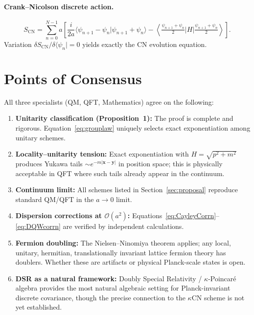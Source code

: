 \documentclass[11pt,a4paper]{article}
\begin{document}
\paragraph{Crank--Nicolson discrete action.}
\begin{equation}
  S_{\mathrm{CN}} = \sum_{n=0}^{N-1} a\left[\frac{i}{2a}\langle\psi_{n+1}-\psi_n|\psi_{n+1}+\psi_n\rangle - \left\langle\tfrac{\psi_{n+1}+\psi_n}{2}\Big|H\Big|\tfrac{\psi_{n+1}+\psi_n}{2}\right\rangle\right].
  \label{eq:CNaction}
\end{equation}
Variation $\delta S_{\mathrm{CN}}/\delta\langle\psi_n|=0$ yields exactly the CN evolution equation.

\section{Points of Consensus}
\label{sec:consensus}

All three specialists (QM, QFT, Mathematics) agree on the following:

\begin{enumerate}
  \item \textbf{Unitarity classification (Proposition~1):} The proof is complete and rigorous. Equation~\eqref{eq:grouplaw} uniquely selects exact exponentiation among unitary schemes.
  \item \textbf{Locality--unitarity tension:} Exact exponentiation with $H = \sqrt{p^2+m^2}$ produces Yukawa tails $\sim e^{-m|\mathbf{x}-\mathbf{y}|}$ in position space; this is physically acceptable in QFT where such tails already appear in the continuum.
  \item \textbf{Continuum limit:} All schemes listed in Section~\ref{sec:proposal} reproduce standard QM/QFT in the $a\to 0$ limit.
  \item \textbf{Dispersion corrections at $\mathcal{O}(a^2)$:} Equations~\eqref{eq:CayleyCorrn}--\eqref{eq:DQWcorrn} are verified by independent calculations.
  \item \textbf{Fermion doubling:} The Nielsen--Ninomiya theorem applies; any local, unitary, hermitian, translationally invariant lattice fermion theory has doublers. Whether these are artifacts or physical Planck-scale states is open.
  \item \textbf{DSR as a natural framework:} Doubly Special Relativity / $\kappa$-Poincar\'{e} algebra \cite{ashtekar2004,henson2006} provides the most natural algebraic setting for Planck-invariant discrete covariance, though the precise connection to the $\kappa$CN scheme is not yet established.
\end{enumerate}
\end{document}
